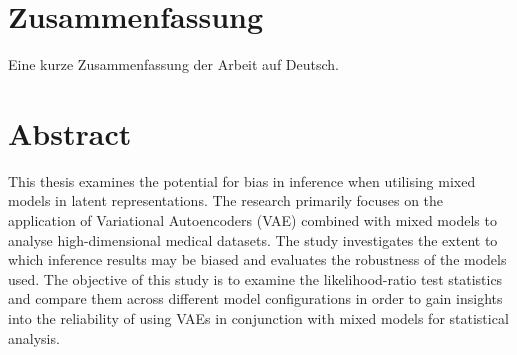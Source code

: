 \documentclass[%
thesis=student,%
coverpage=false,%
titlepage=false,%
headmarks=true, %
german,%
font=libertine, %
math=newpxtx, %
BCOR=5mm,%
coverBCOR=11mm%
]{tumbook}
\theoremstyle{break}
\begin{document}
\cleardoublepage{}

\tableofcontents

\cleardoublepage{}

\section{Zusammenfassung}
Eine kurze Zusammenfassung der Arbeit auf Deutsch.

\section*{Abstract}
This thesis examines the potential for bias in inference when utilising mixed models in latent representations. The research primarily focuses on the application of Variational Autoencoders (VAE) combined with mixed models to analyse high-dimensional medical datasets. The study investigates the extent to which inference results may be biased and evaluates the robustness of the models used. The objective of this study is to examine the likelihood-ratio test statistics and compare them across different model configurations in order to gain insights into the reliability of using VAEs in conjunction with mixed models for statistical analysis.
\mainmatter{}
\end{document}
